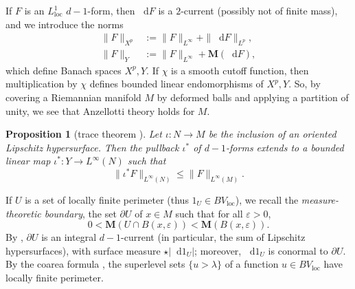 \documentclass[reqno,11pt]{amsart}
\newcommand*\dif{\mathop{}\!\mathrm{d}}
\newcommand{\Mass}{\mathbf M}
\newcommand{\dfn}[1]{\emph{#1}\index{#1}}
\newcommand{\loc}{\mathrm{loc}}
\newtheorem{proposition}[theorem]{Proposition}
\theoremstyle{definition}
\numberwithin{equation}{section}
\begin{document}
If $F$ is an $L^1_\loc$ $d - 1$-form, then $\dif F$ is a $2$-current (possibly not of finite mass), and we introduce the norms
\begin{align*}
\|F\|_{X^p} &:= \|F\|_{L^\infty} + \|\dif F\|_{L^p}, \\
\|F\|_Y &:= \|F\|_{L^\infty} + \Mass(\dif F),
\end{align*}
which define Banach spaces $X^p, Y$.
If $\chi$ is a smooth cutoff function, then multiplication by $\chi$ defines bounded linear endomorphisms of $X^p, Y$.
So, by covering a Riemannian manifold $M$ by deformed balls and applying a partition of unity, we see that Anzellotti theory holds for $M$.

\begin{proposition}[trace theorem {\cite[Theorem 1.2]{Anzellotti1983}}]\label{integration is welldefined}
Let $\iota: N \to M$ be the inclusion of an oriented Lipschitz hypersurface.
Then the pullback $\iota^*$ of $d - 1$-forms extends to a bounded linear map $\iota^*: Y \to L^\infty(N)$ such that
\begin{equation}\label{integral over chain is linfinity}
	\|\iota^* F\|_{L^\infty(N)} \leq \|F\|_{L^\infty(M)}.
\end{equation}
\end{proposition}

If $U$ is a set of locally finite perimeter (thus $1_U \in BV_\loc$), we recall the \dfn{measure-theoretic boundary}, the set $\partial U$ of $x \in M$ such that for all $\varepsilon > 0$,
$$0 < \Mass(U \cap B(x, \varepsilon)) < \Mass(B(x, \varepsilon)).$$
By \cite[Theorem 4.4]{Giusti77}, $\partial U$ is an integral $d - 1$-current (in particular, the sum of Lipschitz hypersurfaces), with surface measure $\star |\dif 1_U|$; moreover, $\dif 1_U$ is conormal to $\partial U$.
By the coarea formula \cite[Theorem 1.23]{Giusti77}, the superlevel sets $\{u > \lambda\}$ of a function $u \in BV_\loc$ have locally finite perimeter.
\end{document}
